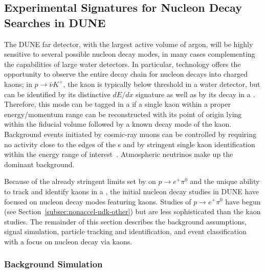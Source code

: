 \subsection{Experimental Signatures for Nucleon Decay Searches in DUNE}
\label{subsec:nonaccel-ndk-dune}

The DUNE far detector, with the largest active volume of argon, 
will be highly sensitive to several possible nucleon decay modes, 
in many cases complementing the capabilities of large water detectors.
In particular, \lartpc technology offers the opportunity to observe the entire decay chain for nucleon decays into charged kaons; in $p \rightarrow \bar{\nu}K^{+}$, the kaon is typically below \cherenkov threshold in a water \cherenkov detector, but can be identified by its distinctive $dE/dx$ signature as well as by its decay in a \lartpc.
Therefore, this mode can be tagged in a \lartpc if a single kaon within a proper energy/momentum range can be reconstructed with its point of origin lying within the fiducial volume followed by a known decay mode of the kaon.
Background events initiated by cosmic-ray muons can be controlled  by requiring no activity close to the edges of the s and by stringent single kaon identification within the energy range of interest~\cite{bib:docdb3384,bib:docdb1752}.  Atmospheric neutrinos make up the dominant background.

Because of the already stringent limits set by \superk on $p \rightarrow e^{+}\pi^0$ and the unique ability to track and identify kaons in a \lartpc, the initial nucleon decay studies in DUNE have focused on nucleon decay modes featuring kaons.  Studies of $p \rightarrow e^{+}\pi^0$ have begun (see Section~\ref{subsec:nonaccel-ndk-other}) but are less sophisticated than the kaon studies.  The remainder of this section describes the background assumptions, signal simulation, particle tracking and identification, and event classification with a focus on nucleon decay via kaons.

\subsubsection{Background Simulation}
\label{sec:ndkbkgd}

